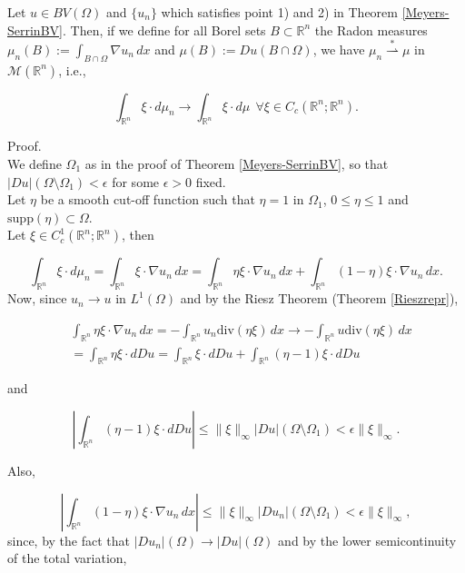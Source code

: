 \begin{lemma} \label{BVweak-star} Let $u \in BV(\Omega)$ and $\{u_{n}\}$ which satisfies point 1) and 2) in Theorem \ref{Meyers-SerrinBV}. Then, if we define for all Borel sets $B \subset \mathbb{R}^{n}$ the Radon measures $\mu_{n}(B) := \int_{B \cap \Omega} \nabla u_{n} \, dx$ and $\mu(B) := Du(B \cap \Omega)$, we have $\mu_{n} \stackrel {*}{\rightharpoonup} \mu$ in $\mathcal{M}(\mathbb{R}^{n})$, i.e., 

\[ \int_{\mathbb{R}^{n}} \xi \cdot d \mu_{n} \to \int_{\mathbb{R}^{n}} \xi \cdot d \mu \  \ \forall \xi \in C_{c}(\mathbb{R}^{n}; \mathbb{R}^{n}). \]
\end{lemma}
Proof. 
\\
We define $\Omega_{1}$ as in the proof of Theorem \ref{Meyers-SerrinBV}, so that $|Du|(\Omega \setminus \Omega_{1}) < \epsilon$ for some $\epsilon > 0$ fixed. 
\\
Let $\eta$ be a smooth cut-off function such that $\eta = 1$ in $\Omega_{1}$, $0 \le \eta \le 1$ and $\mathrm{supp}(\eta) \subset \Omega$.
\\
Let $\xi \in C^{1}_{c}(\mathbb{R}^{n}; \mathbb{R}^{n})$, then

\[ \int_{\mathbb{R}^{n}} \xi \cdot d \mu_{n} = \int_{\mathbb{R}^{n}} \xi \cdot \nabla u_{n} \, dx = \int_{\mathbb{R}^{n}} \eta \xi \cdot \nabla u_{n} \, dx + \int_{\mathbb{R}^{n}} (1 - \eta) \xi \cdot \nabla u_{n} \, dx. \]
Now, since $u_{n} \to u$ in $L^{1}(\Omega)$ and by the Riesz Theorem (Theorem \ref{Rieszrepr}),  

\begin{align*} & \int_{\mathbb{R}^{n}} \eta \xi \cdot \nabla u_{n} \, dx = - \int_{\mathbb{R}^{n}} u_{n} \mathrm{div}(\eta \xi) \, dx \to - \int_{\mathbb{R}^{n}} u \mathrm{div}(\eta \xi) \, dx \\
& = \int_{\mathbb{R}^{n}} \eta \xi \cdot d Du = \int_{\mathbb{R}^{n}} \xi \cdot d Du + \int_{\mathbb{R}^{n}} (\eta - 1) \xi \cdot d Du \end{align*}

and 

\[ \left | \int_{\mathbb{R}^{n}} (\eta - 1) \xi \cdot d Du \right | \le \|\xi\|_{\infty} |Du|( \Omega \setminus \Omega_{1}) < \epsilon \|\xi\|_{\infty}. \]

Also,

\[ \left | \int_{\mathbb{R}^{n}} (1 - \eta) \xi \cdot \nabla u_{n} \, dx \right | \le \|\xi\|_{\infty} |Du_{n}|(\Omega \setminus \Omega_{1}) < \epsilon \|\xi\|_{\infty}, \]
since, by the fact that $|Du_{n}|(\Omega) \to |Du|(\Omega)$ and by the lower semicontinuity of the total variation,

